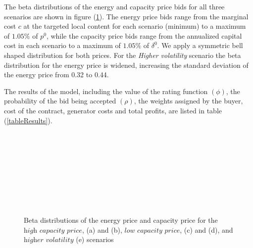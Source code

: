 \documentclass[informs]{informs3}
\begin{document}
The beta distributions of the energy and capacity price bids for all three scenarios are shown in figure (\ref{figBetaPrices}). The energy price bids range from the marginal cost $c$ at the targeted local content for each scenario (minimum) to a maximum of $1.05\%$ of $p^0$, while the capacity price bids range from the annualized capital cost in each scenario to a maximum of $1.05\%$ of $\delta^0$. We apply a symmetric bell shaped distribution for both prices. For the \textit{Higher volatility} scenario the beta distribution for the energy price is widened, increasing the standard deviation of the energy price from 0.32 to 0.44.

The results of the model, including the value of the rating function $(\phi)$, the probability of the bid being accepted $(\rho)$, the weights assigned by the buyer, cost of the contract, generator costs and total profits, are listed in table (\ref{tableResults}).
\begin{figure}
	\centering 
    \begin{subfigure}[b]{0.5\textwidth}
    \end{subfigure}~
    \begin{subfigure}[b]{0.5\textwidth}
    \end{subfigure}\\
    \begin{subfigure}[b]{0.5\textwidth}
    \end{subfigure}~
    \begin{subfigure}[b]{0.5\textwidth}
    \end{subfigure}\\
        \begin{subfigure}[b]{0.5\textwidth}
    \end{subfigure}~
    \caption{Beta distributions of the energy price and capacity price for the $\textit{high capacity price}$, (a) and (b), $\textit{low capacity price}$, (c) and (d), and $\textit{higher volatility} $ (e) scenarios}
    \label{figBetaPrices}
\end{figure}
\end{document}
